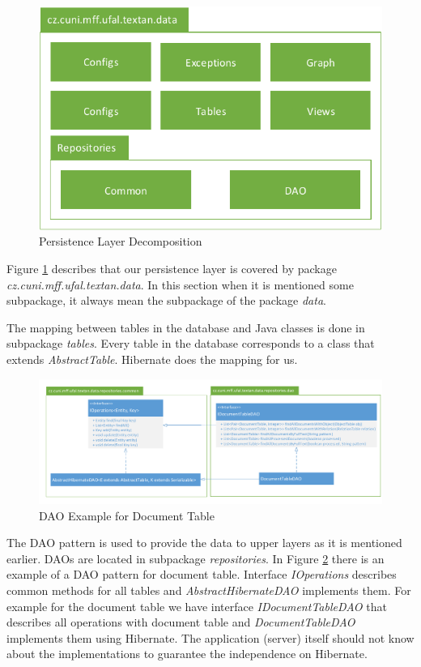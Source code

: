 \begin{figure}[!htb]
        \centering
        \includegraphics{Images/DataDecomposition}
        \caption{Persistence Layer Decomposition}
        \label{fig:DataDecomposition}
\end{figure}

Figure \ref{fig:DataDecomposition} describes that our persistence layer is
covered by package \emph{cz.\-cuni.\-mff.\-ufal.\-textan.\-data}. In this section when it is
mentioned some subpackage, it always mean the subpackage of the package \emph{data}.

The mapping between tables in the database and Java classes is done in
subpackage \emph{tables}. Every table in the database corresponds to a class
that extends \emph{AbstractTable}. Hibernate does the mapping for us.

\begin{figure}[!htb]
        \centering
        \includegraphics[width=\textwidth]{Images/DatabaseDAO}
        \caption{DAO Example for Document Table}
        \label{fig:DatabaseDAO}
\end{figure}

The DAO pattern is used to provide the data to upper layers as it is mentioned
earlier. DAOs are located in subpackage \emph{repositories}.
In Figure \ref{fig:DatabaseDAO} there is an example of a
DAO pattern for document table. Interface \emph{IOperations} describes common
methods for all tables and \emph{AbstractHibernateDAO} implements them. For
example for the document table we have interface \emph{IDocumentTableDAO} that
describes all operations with document table and \emph{DocumentTableDAO}
implements them using Hibernate. The application (server) itself should not know
about the implementations to guarantee the independence on Hibernate.

